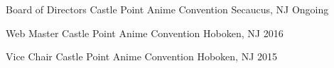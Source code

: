 

\begin{cvhonors}

	\cvhonor
		{Board of Directors} %
		{Castle Point Anime Convention} %
		{Secaucus, NJ} %
		{Ongoing} %

	\cvhonor
		{Web Master} %
		{Castle Point Anime Convention} %
		{Hoboken, NJ} %
		{2016} %

	\cvhonor
		{Vice Chair} %
		{Castle Point Anime Convention} %
		{Hoboken, NJ} %
		{2015} %

\end{cvhonors}

